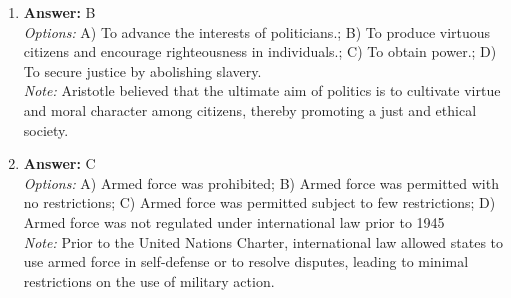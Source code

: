 \documentclass[12pt]{article}
\begin{document}
\begin{enumerate}[label=\arabic*.]
\item \textbf{Answer:} B
\\ \textit{Options:} A) To advance the interests of politicians.; B) To produce virtuous citizens and encourage righteousness in individuals.; C) To obtain power.; D) To secure justice by abolishing slavery.
\\ \textit{Note:} Aristotle believed that the ultimate aim of politics is to cultivate virtue and moral character among citizens, thereby promoting a just and ethical society.
\item \textbf{Answer:} C
\\ \textit{Options:} A) Armed force was prohibited; B) Armed force was permitted with no restrictions; C) Armed force was permitted subject to few restrictions; D) Armed force was not regulated under international law prior to 1945
\\ \textit{Note:} Prior to the United Nations Charter, international law allowed states to use armed force in self-defense or to resolve disputes, leading to minimal restrictions on the use of military action.
\end{enumerate}
\end{document}
